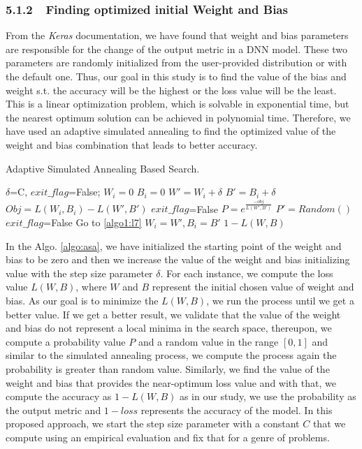 \subsubsection{5.1.2~~Finding optimized initial Weight and Bias}
From the \emph{Keras} documentation, we have found that weight and bias parameters are responsible for the change of the output metric in a DNN model. These two parameters are randomly initialized from the user-provided distribution or with the default one. Thus, our goal in this study is to find the value of the bias and weight s.t. the accuracy will be the highest or the loss value will be the least. This is a linear optimization problem, which is solvable in exponential time, but the nearest optimum solution can be achieved in polynomial time. Therefore, we have used an adaptive simulated annealing \cite{ingber2000adaptive} to find the optimized value of the weight and bias combination that leads to better accuracy. 
\begin{algorithm}[H]
	\footnotesize
	\caption{\footnotesize Adaptive Simulated Annealing Based Search.}
	\label{algo:asa}
	\begin{algorithmic}[1]
		\State $\delta$=C, $exit\_flag$=False;
		\label{algo1:l3}
		\State $W_i=0$\label{algo1:l4}
		\State $B_i=0$\label{algo1:l5}
		\label{algo1:l7}
		\State $W'=W_i+\delta$
		\State $B'=B_i+\delta$
		\State $Obj=L(W_i,B_i)-L(W',B')$
		\State $exit\_flag$=False
		\Else
		\State $P=e^{\frac{-obj}{L(W',B')}}$
		\State $P'=Random()$
		\State  $exit\_flag$=False
		\EndIf
		\EndIf
		\Else
		\State Go to \ref{algo1:l7}
		\EndIf
		\EndWhile
		\State $W_i=W', B_i=B'$
		\EndFor\label{algo1:l6}
		\State \Return $1-L(W,B)$\label{algo2:l12}
		\EndProcedure\label{algo2:l13}
	\end{algorithmic} 
\end{algorithm}
In the Algo. \ref{algo:asa}, we have initialized the starting point of the weight and bias to be zero and then we increase the value of the weight and bias initializing value with the step size parameter $\delta$. For each instance, we compute the loss value $L(W, B)$, where $W$ and $B$ represent the initial chosen value of weight and bias. As our goal is to minimize the $L(W, B)$, we run the process until we get a better value. If we get a better result, we validate that the value of the weight and bias do not represent a local minima in the search space, thereupon, we compute a probability value $P$ and a random value in the range $[0,1]$ and similar to the simulated annealing process, we compute the process again the probability is greater than random value. Similarly, we find the value of the weight and bias that provides the near-optimum loss value and with that, we compute the accuracy as $1-L(W, B)$ as in our study, we use the probability as the output metric and $1-loss$ represents the accuracy of the model. In this proposed approach, we start the step size parameter with a constant $C$ that we compute using an empirical evaluation and fix that for a genre of problems.
